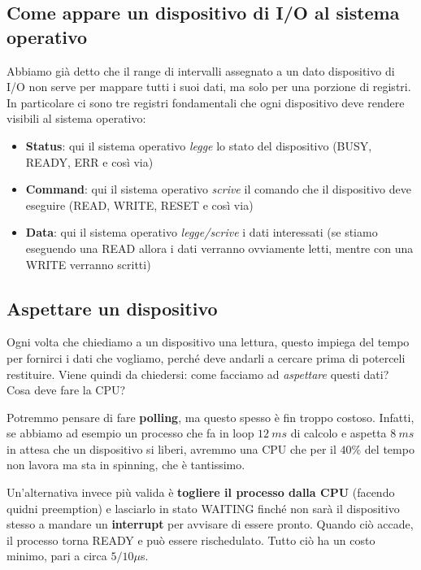 \documentclass[11pt, a4paper, titlepage, oneside]{scrbook}
\begin{document}
\subsection{Come appare un dispositivo di I/O al sistema operativo}

Abbiamo già detto che il range di intervalli assegnato a un dato dispositivo di I/O non serve per mappare tutti i suoi dati, ma solo per una porzione di registri. In particolare ci sono tre registri fondamentali che ogni dispositivo deve rendere visibili al sistema operativo:
\begin{itemize}
    \item \textbf{Status}: qui il sistema operativo \textit{legge} lo stato del dispositivo (BUSY, READY, ERR e così via)
    \item \textbf{Command}: qui il sistema operativo \textit{scrive} il comando che il dispositivo deve eseguire (READ, WRITE, RESET e così via)
    \item \textbf{Data}: qui il sistema operativo \textit{legge/scrive} i dati interessati (se stiamo eseguendo una READ allora i dati verranno ovviamente letti, mentre con una WRITE verranno scritti)
\end{itemize}

\subsection{Aspettare un dispositivo}

Ogni volta che chiediamo a un dispositivo una lettura, questo impiega del tempo per fornirci i dati che vogliamo, perché deve andarli a cercare prima di poterceli restituire. Viene quindi da chiedersi: come facciamo ad \textit{aspettare} questi dati? Cosa deve fare la CPU?

Potremmo pensare di fare \textbf{polling}, ma questo spesso è fin troppo costoso. Infatti, se abbiamo ad esempio un processo che fa in loop $\SI{12}{ms}$ di calcolo e aspetta $\SI{8}{ms}$ in attesa che un dispositivo si liberi, avremmo una CPU che per il $40\%$ del tempo non lavora ma sta in spinning, che è tantissimo.

Un'alternativa invece più valida è \textbf{togliere il processo dalla CPU} (facendo quidni preemption) e lasciarlo in stato WAITING finché non sarà il dispositivo stesso a mandare un \textbf{interrupt} per avvisare di essere pronto. Quando ciò accade, il processo torna READY e può essere rischedulato. Tutto ciò ha un costo minimo, pari a circa $5/10 \mu$s. 
\end{document}
